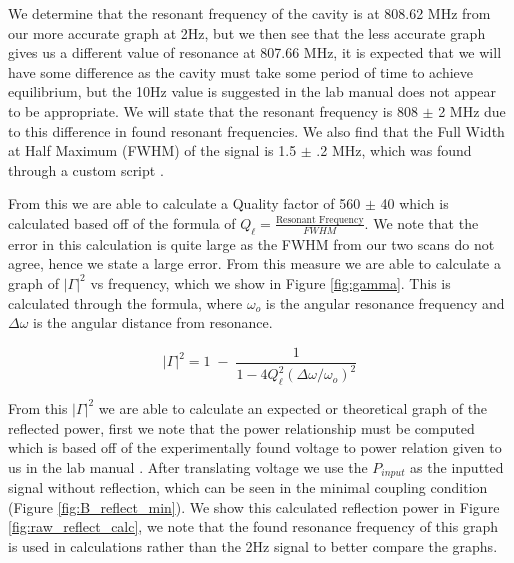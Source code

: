 We determine that the resonant frequency of the cavity is at 808.62 MHz from our more accurate graph at 2Hz, but we then see that the less accurate graph gives us a different value of resonance at 807.66 MHz, it is expected that we will have some difference as the cavity must take some period of time to achieve equilibrium, but the 10Hz value is suggested in the lab manual does not appear to be appropriate. We will state that the resonant frequency is 808 $\pm$ 2 MHz due to this difference in found resonant frequencies. We also find that the Full Width at Half Maximum (FWHM) of the signal is 1.5 $\pm$ .2 MHz, which was found through a custom script \cite{code}.

From this we are able to calculate a Quality factor of 560 $\pm$ 40 which is calculated based off of the formula of $Q_\ell = \frac{\text{Resonant Frequency}}{FWHM}$. We note that the error in this calculation is quite large as the FWHM from our two scans do not agree, hence we state a large error. From this measure we are able to calculate a graph of $|\Gamma|^2$ vs frequency, which we show in Figure \ref{fig:gamma}. This is calculated through the formula, where $\omega_o$ is the angular resonance frequency and $\Delta\omega$ is the angular distance from resonance.

\begin{equation}
    |\Gamma|^2 = 1\; -\; \frac{1}{1-4 Q_\ell^2 (\Delta\omega/\omega_o)^2}
\end{equation}

From this $|\Gamma|^2$ we are able to calculate an expected or theoretical graph of the reflected power, first we note that the power relationship must be computed which is based off of the experimentally found voltage to power relation given to us in the lab manual \cite{LabProcedure}. After translating voltage we use the $P_{input}$ as the inputted signal without reflection, which can be seen in the minimal coupling condition (Figure \ref{fig:B_reflect_min}). We show this calculated reflection power in Figure \ref{fig:raw_reflect_calc}, we note that the found resonance frequency of this graph is used in calculations rather than the 2Hz signal to better compare the graphs. 

